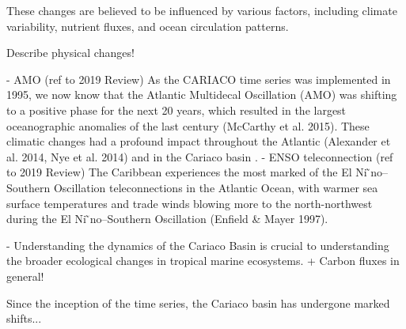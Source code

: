 





    
    These changes are believed to be influenced by various factors, including climate variability, nutrient fluxes, and ocean circulation patterns.

    Describe physical changes!

    - AMO (ref to 2019 Review)
    As the CARIACO time series was implemented in 1995, we now know that the Atlantic Multidecal Oscillation (AMO) was shifting to a positive phase for the next 20 years, which resulted in the largest oceanographic anomalies of the last century (McCarthy et al. 2015). These climatic changes had a profound impact throughout the Atlantic (Alexander et al. 2014, Nye et al. 2014) and in the Cariaco basin \cite{taylor_ecosystem_2012,pinckney_phytoplankton_2015}.
    - ENSO teleconnection (ref to 2019 Review)
    The Caribbean experiences the most marked of the El Ni  ̃no–Southern Oscillation teleconnections in the Atlantic Ocean, with warmer sea surface temperatures and trade winds blowing more to the north-northwest during the El Ni  ̃no–Southern Oscillation (Enfield & Mayer 1997).

     - Understanding the dynamics of the Cariaco Basin is crucial to understanding the broader ecological changes in tropical marine ecosystems. + Carbon fluxes in general!



    








    
    
    Since the inception of the time series, the Cariaco basin has undergone marked shifts...

